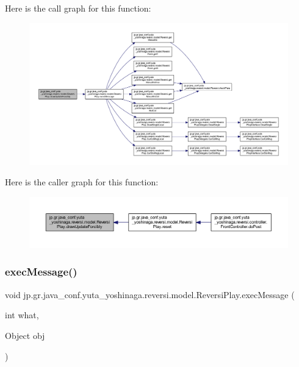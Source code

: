 Here is the call graph for this function\+:
\nopagebreak
\begin{figure}[H]
\begin{center}
\leavevmode
\includegraphics[width=350pt]{classjp_1_1gr_1_1java__conf_1_1yuta__yoshinaga_1_1reversi_1_1model_1_1_reversi_play_a216cece80255198785a95ccbaf1cef53_cgraph}
\end{center}
\end{figure}
Here is the caller graph for this function\+:
\nopagebreak
\begin{figure}[H]
\begin{center}
\leavevmode
\includegraphics[width=350pt]{classjp_1_1gr_1_1java__conf_1_1yuta__yoshinaga_1_1reversi_1_1model_1_1_reversi_play_a216cece80255198785a95ccbaf1cef53_icgraph}
\end{center}
\end{figure}
\mbox{\label{classjp_1_1gr_1_1java__conf_1_1yuta__yoshinaga_1_1reversi_1_1model_1_1_reversi_play_a8c5c00aeb6656d7806416ac577b77e3b}} 
\subsubsection{\texorpdfstring{exec\+Message()}{execMessage()}}
{\footnotesize\ttfamily void jp.\+gr.\+java\+\_\+conf.\+yuta\+\_\+yoshinaga.\+reversi.\+model.\+Reversi\+Play.\+exec\+Message (\begin{DoxyParamCaption}\item[{int}]{what,  }\item[{Object}]{obj }\end{DoxyParamCaption})\hspace{0.3cm}{\ttfamily [private]}}



